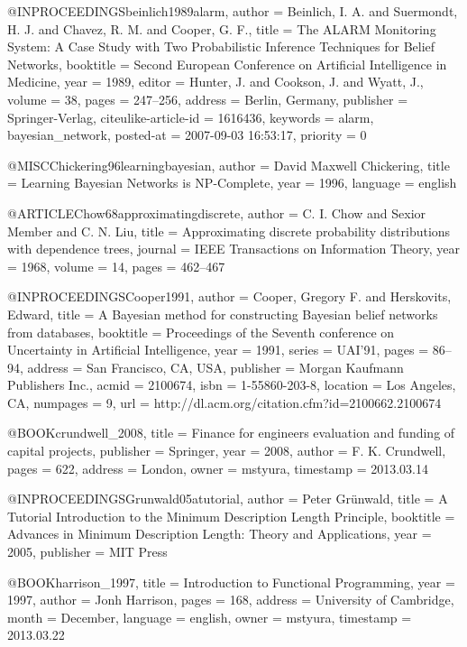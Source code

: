 @INPROCEEDINGS{beinlich1989alarm,
  author = {Beinlich, I. A. and Suermondt, H. J. and Chavez, R. M. and Cooper,
	G. F.},
  title = {{The ALARM Monitoring System: A Case Study with Two Probabilistic
	Inference Techniques for Belief Networks}},
  booktitle = {Second European Conference on Artificial Intelligence in Medicine},
  year = {1989},
  editor = {Hunter, J. and Cookson, J. and Wyatt, J.},
  volume = {38},
  pages = {247--256},
  address = {Berlin, Germany},
  publisher = {Springer-Verlag},
  citeulike-article-id = {1616436},
  keywords = {alarm, bayesian\_network},
  posted-at = {2007-09-03 16:53:17},
  priority = {0}
}

@MISC{Chickering96learningbayesian,
  author = {David Maxwell Chickering},
  title = {Learning Bayesian Networks is NP-Complete},
  year = {1996},
  language = {english}
}

@ARTICLE{Chow68approximatingdiscrete,
  author = {C. I. Chow and Sexior Member and C. N. Liu},
  title = {Approximating discrete probability distributions with dependence
	trees},
  journal = {IEEE Transactions on Information Theory},
  year = {1968},
  volume = {14},
  pages = {462--467}
}

@INPROCEEDINGS{Cooper1991,
  author = {Cooper, Gregory F. and Herskovits, Edward},
  title = {A Bayesian method for constructing Bayesian belief networks from
	databases},
  booktitle = {Proceedings of the Seventh conference on Uncertainty in Artificial
	Intelligence},
  year = {1991},
  series = {UAI'91},
  pages = {86--94},
  address = {San Francisco, CA, USA},
  publisher = {Morgan Kaufmann Publishers Inc.},
  acmid = {2100674},
  isbn = {1-55860-203-8},
  location = {Los Angeles, CA},
  numpages = {9},
  url = {http://dl.acm.org/citation.cfm?id=2100662.2100674}
}

@BOOK{crundwell_2008,
  title = {Finance for engineers evaluation and funding of capital projects},
  publisher = {Springer},
  year = {2008},
  author = {F. K. Crundwell},
  pages = {622},
  address = {London},
  owner = {mstyura},
  timestamp = {2013.03.14}
}

@INPROCEEDINGS{Grunwald05atutorial,
  author = {Peter Grünwald},
  title = {A Tutorial Introduction to the Minimum Description Length Principle},
  booktitle = {Advances in Minimum Description Length: Theory and Applications},
  year = {2005},
  publisher = {MIT Press}
}

@BOOK{harrison_1997,
  title = {Introduction to Functional Programming},
  year = {1997},
  author = {Jonh Harrison},
  pages = {168},
  address = {University of Cambridge},
  month = {December},
  language = {english},
  owner = {mstyura},
  timestamp = {2013.03.22}
}

